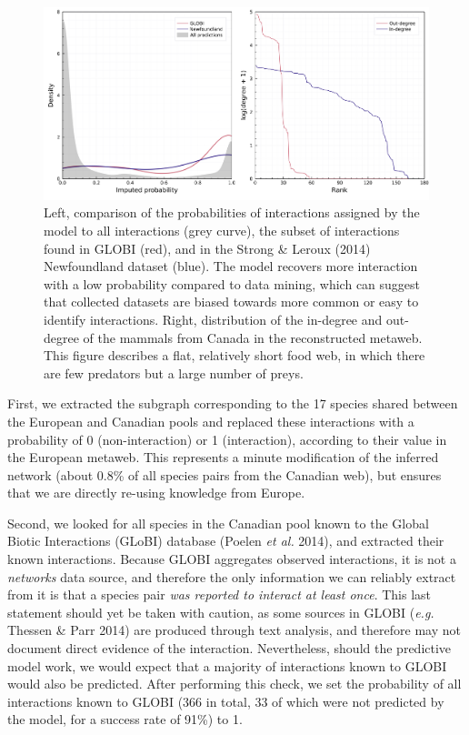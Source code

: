 \documentclass[10pt,oneside]{article}
\makeatletter
\def\maxwidth{\ifdim\Gin@nat@width>\linewidth\linewidth
\else\Gin@nat@width\fi}
\let\Oldincludegraphics\includegraphics
\renewcommand{\includegraphics}[1]{\Oldincludegraphics[width=\maxwidth]{#1}}
\makeatother
\begin{document}
\begin{figure}
\hypertarget{fig:inflation}{%
\centering
\includegraphics{figures/figure-validation.png}
\caption{Left, comparison of the probabilities of interactions assigned
by the model to all interactions (grey curve), the subset of
interactions found in GLOBI (red), and in the Strong \& Leroux (2014)
Newfoundland dataset (blue). The model recovers more interaction with a
low probability compared to data mining, which can suggest that
collected datasets are biased towards more common or easy to identify
interactions. Right, distribution of the in-degree and out-degree of the
mammals from Canada in the reconstructed metaweb. This figure describes
a flat, relatively short food web, in which there are few predators but
a large number of preys.}\label{fig:inflation}
}
\end{figure}

First, we extracted the subgraph corresponding to the 17 species shared
between the European and Canadian pools and replaced these interactions
with a probability of 0 (non-interaction) or 1 (interaction), according
to their value in the European metaweb. This represents a minute
modification of the inferred network (about 0.8\% of all species pairs
from the Canadian web), but ensures that we are directly re-using
knowledge from Europe.

Second, we looked for all species in the Canadian pool known to the
Global Biotic Interactions (GLoBI) database (Poelen \emph{et al.} 2014),
and extracted their known interactions. Because GLOBI aggregates
observed interactions, it is not a \emph{networks} data source, and
therefore the only information we can reliably extract from it is that a
species pair \emph{was reported to interact at least once}. This last
statement should yet be taken with caution, as some sources in GLOBI
(\emph{e.g.} Thessen \& Parr 2014) are produced through text analysis,
and therefore may not document direct evidence of the interaction.
Nevertheless, should the predictive model work, we would expect that a
majority of interactions known to GLOBI would also be predicted. After
performing this check, we set the probability of all interactions known
to GLOBI (366 in total, 33 of which were not predicted by the model, for
a success rate of 91\%) to 1.
\end{document}
